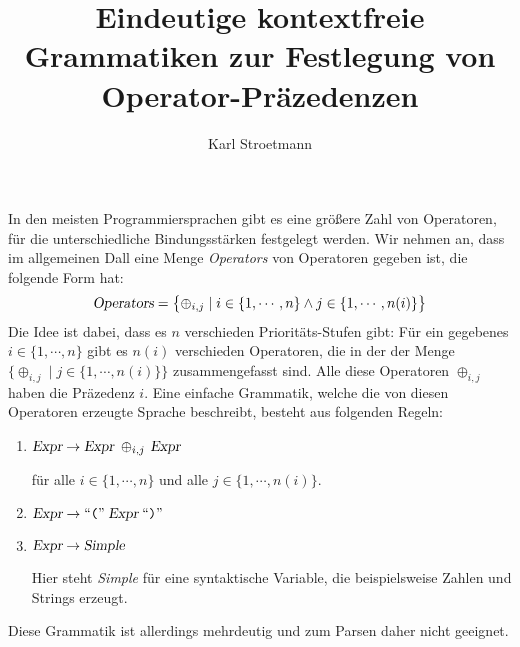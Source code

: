 \documentclass{article}
\title{Eindeutige kontextfreie Grammatiken zur Festlegung von Operator-Pr\"azedenzen}
\author{Karl Stroetmann}
\newcommand{\squoted}[1]{\mbox{``\texttt{#1}''}}
\begin{document}
\maketitle

In den meisten Programmiersprachen gibt es eine gr\"o{\ss}ere Zahl von Operatoren, f\"ur die 
unterschiedliche Bindungsst\"arken festgelegt werden.  Wir nehmen an, dass im allgemeinen
Dall eine Menge \textsl{Operators} von Operatoren gegeben ist, die folgende Form hat:
\[ 
   \textsl{Operators} = 
   \bigl\{ \oplus_{i,j} \mid i \in \{1,\cdots,n\} \wedge j \in \{ 1, \cdots, n(i) \} \bigl\}
\]
Die Idee ist dabei, dass es $n$ verschieden Priorit\"ats-Stufen gibt:  F\"ur ein gegebenes 
$i \in \{1,\cdots,n\}$ gibt es $n(i)$ verschieden Operatoren, die in der der Menge
$\bigl\{ \oplus_{i,j} \mid j \in \{ 1, \cdots, n(i) \} \bigl\}$
zusammengefasst sind.  Alle diese  Operatoren $\oplus_{i,j}$ haben die Pr\"azedenz $i$.
Eine einfache Grammatik, welche die von diesen Operatoren erzeugte Sprache beschreibt,
besteht aus folgenden Regeln:
\begin{enumerate}
\item $\textsl{Expr} \rightarrow \textsl{Expr} \;\oplus_{i,j}\, \textsl{Expr}$

      f\"ur alle $i \in \{ 1, \cdots, n \}$ und alle $j \in \{ 1, \cdots, n(i) \}$.
\item $\textsl{Expr} \rightarrow \squoted{(} \;\textsl{Expr}\; \squoted{)}$
\item $\textsl{Expr} \rightarrow \textsl{Simple}$

      Hier steht \textsl{Simple} f\"ur eine syntaktische Variable, die beispielsweise
      Zahlen und Strings erzeugt.
\end{enumerate}
Diese Grammatik ist allerdings mehrdeutig und zum Parsen daher nicht geeignet.
\end{document}
